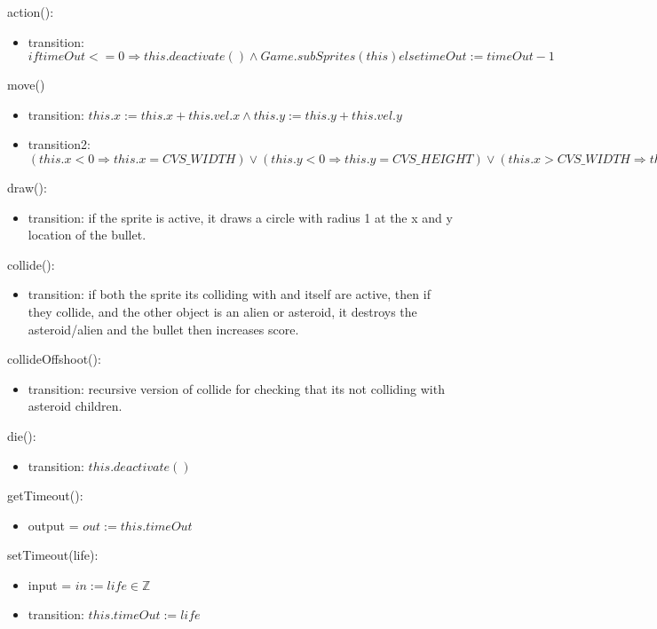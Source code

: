 \documentclass[12pt]{article}
\begin{document}
\noindent action():
\begin{itemize}
    \item transition: $if timeOut <=0 \Rightarrow this.deactivate() \land Game.subSprites(this) else timeOut := timeOut - 1$
\end{itemize}

\noindent move()
\begin{itemize}
    \item transition: $this.x := this.x + this.vel.x \land this.y := this.y + this.vel.y$
    \item transition2: $(this.x < 0 \Rightarrow this.x = CVS\_WIDTH) \lor (this.y < 0 \Rightarrow this.y = CVS\_HEIGHT) \lor (this.x > CVS\_WIDTH \Rightarrow this.x = 0) \lor (this.y > CVS\_HEIGHT \Rightarrow this.y = 0)$
\end{itemize}

\noindent draw():
\begin{itemize}
    \item transition: if the sprite is active, it draws a circle with radius 1 at the x and y location of the bullet.
\end{itemize}

\noindent collide():
\begin{itemize}
    \item transition: if both the sprite its colliding with and itself are active, then if they collide, and the other object is an alien or asteroid, it destroys the asteroid/alien and the bullet then increases score.
\end{itemize}

\noindent collideOffshoot():
\begin{itemize}
    \item transition: recursive version of collide for checking that its not colliding with asteroid children.
\end{itemize}
\newpage

\noindent die():
\begin{itemize}
    \item transition: $this.deactivate()$
\end{itemize}
\noindent getTimeout():
\begin{itemize}
    \item output = $out := this.timeOut$
\end{itemize}

\noindent setTimeout(life):
\begin{itemize}
    \item input = $in := life \in \mathbb{Z}$
    \item transition: $this.timeOut := life$
\end{itemize}
\end{document}
